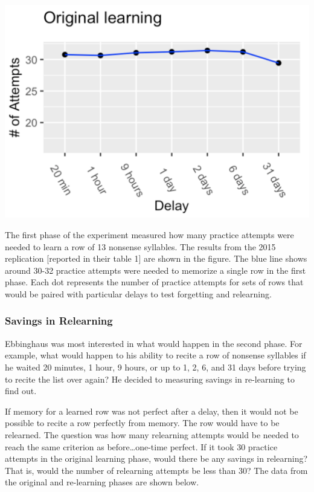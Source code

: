 \documentclass[
  oneside,
  12pt]{crumpbook}
\newenvironment{floatright50}{%
  \wrapfigure{R}{.5\textwidth}%
  }{%
  \endwrapfigure}
\begin{document}
\begin{floatright50}
\includegraphics[width=1\linewidth]{imgs/Ebbinghaus_OL}

\end{floatright50}

The first phase of the experiment measured how many practice attempts were needed to learn a row of 13 nonsense syllables. The results from the 2015 replication {[}reported in their table 1{]} are shown in the figure. The blue line shows around 30-32 practice attempts were needed to memorize a single row in the first phase. Each dot represents the number of practice attempts for sets of rows that would be paired with particular delays to test forgetting and relearning.

\hypertarget{savings-in-relearning}{%
\subsubsection{Savings in Relearning}\label{savings-in-relearning}}

Ebbinghaus was most interested in what would happen in the second phase. For example, what would happen to his ability to recite a row of nonsense syllables if he waited 20 minutes, 1 hour, 9 hours, or up to 1, 2, 6, and 31 days before trying to recite the list over again? He decided to measuring savings in re-learning to find out.

If memory for a learned row was not perfect after a delay, then it would not be possible to recite a row perfectly from memory. The row would have to be relearned. The question was how many relearning attempts would be needed to reach the same criterion as before\ldots one-time perfect. If it took 30 practice attempts in the original learning phase, would there be any savings in relearning? That is, would the number of relearning attempts be less than 30? The data from the original and re-learning phases are shown below.
\end{document}
